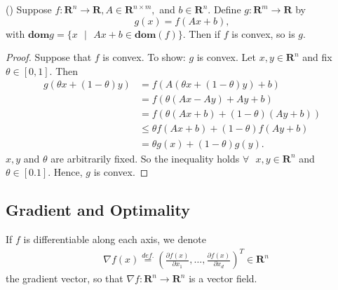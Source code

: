 \begin{proposition}\label{compaf}
(\cite[79]{boyd2004convex})
Suppose $f: \mathbf{R}^{n} \longrightarrow \mathbf{R}, A \in \mathbf{R}^{n\times m},$ and $b \in \mathbf{R}^{n}.$ Define $g: \mathbf{R}^{m} \longrightarrow \mathbf{R}$ by $$g(x)=f(Ax+b),$$ with $\textbf{dom} g = \{x\text{ }|\text{ }Ax+b \in \textbf{dom} (f)\}.$ Then if $f$ is convex, so is $g$.
\end{proposition}
\begin{proof}
Suppose that $f$ is convex. To show: $g$ is convex. Let $x,y \in \mathbf{R}^{n}$ and fix $\theta \in [0,1].$ Then
\begin{align*}
g(\theta x + (1-\theta)y) &= f(A(\theta x + (1-\theta)y) + b)\\
&= f(\theta(Ax - Ay) + Ay + b)\\
&= f(\theta(Ax + b) + (1 - \theta)(Ay+b))\\
&\leq \theta f(Ax + b) + (1-\theta) f(Ay + b)\\
&= \theta g(x) + (1-\theta)g(y).
\end{align*}
$x,y$ and $\theta$ are arbitrarily fixed. So the inequality holds $\forall \text{ } x,y \in \mathbf{R}^{n}$ and $\theta \in [0.1].$ Hence, $g$ is convex. 
\end{proof}
\subsection{Gradient and Optimality}
\begin{definition}[Gradient]\label{gradient}
If $f$ is differentiable along each axis, we denote 
\begin{equation*}\tag{2.2.1}
\begin{aligned}
    &\nabla f(x) \overset{def.}{=} \left(\frac{\partial f(x)}{\partial x_{1}},\ldots,\frac{\partial f(x)}{\partial x_{d}}\right)^{T} \in \mathbf{R}^{n}
\end{aligned}
\end{equation*}
the gradient vector, so that $\nabla f: \mathbf{R}^{n}\longrightarrow \mathbf{R}^{n}$ is a vector field.
\end{definition}

